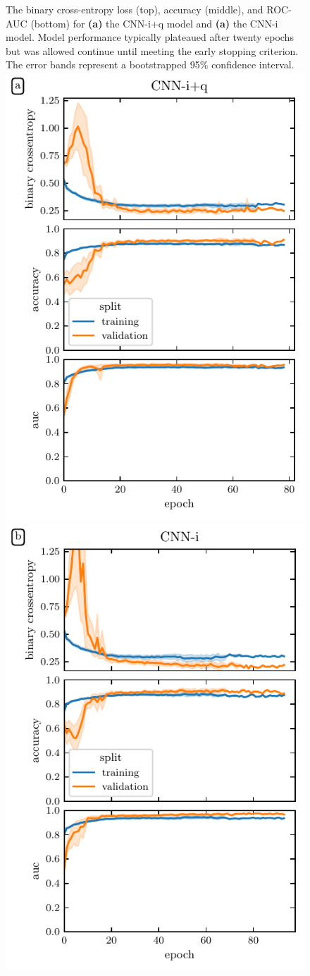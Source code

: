 \documentclass[9pt,lineno]{elife}
\begin{document}
\begin{figure}[tbp]
\begin{fullwidth}
{        The binary cross-entropy loss (top), accuracy (middle), and ROC-AUC
        (bottom) for \textbf{(a)} the CNN-i+q model and \textbf{(a)} the CNN-i
        model. Model performance typically plateaued after twenty epochs but was
        allowed continue until meeting the early stopping criterion. The error
        bands represent a bootstrapped 95\% confidence interval.
    }{%
        \hfill
        \includegraphics[width=0.45\linewidth]{deep-learning-qc/dl_learning_curve_with_qc.pdf}
        \hfill
        \includegraphics[width=0.45\linewidth]{deep-learning-qc/dl_learning_curve_without_qc.pdf}
        \hfill
    }\label{figsupp:dl-loss}
\end{fullwidth}
\end{figure}
\end{document}
